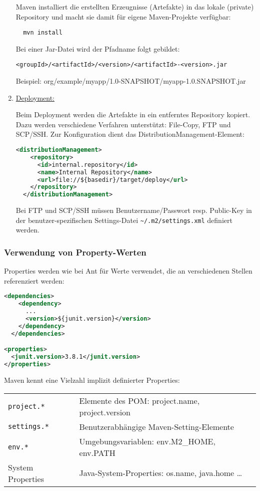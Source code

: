 \begin{enumerate}
Maven installiert die erstellten Erzeugnisse (Artefakte) in das lokale (private)
Repository und macht sie damit für eigene Maven-Projekte verfügbar:
\begin{lstlisting}
  mvn install
\end{lstlisting}
Bei einer Jar-Datei wird der Pfadname folgt gebildet:
\begin{verbatim}
<groupId>/<artifactId>/<version>/<artifactId>-<version>.jar
\end{verbatim}
Beispiel: org/example/myapp/1.0-SNAPSHOT/myapp-1.0.SNAPSHOT.jar
%
\newslide
\item \underline{Deployment:}

Beim Deployment werden die Artefakte in ein entferntes Repository
kopiert. Dazu werden verschiedene Verfahren unterstützt: File-Copy,
FTP und SCP/SSH.
Zur Konfiguration dient das DistributionManagement-Element:
\begin{lstlisting}[language=xml,
  morekeywords={distributionManagement,repository,id,name,url}]
  <distributionManagement>
    <repository>
      <id>internal.repository</id>
      <name>Internal Repository</name>
      <url>file://${basedir}/target/deploy</url>
    </repository>
  </distributionManagement>
\end{lstlisting}
Bei FTP und SCP/SSH müssen Benutzername/Passwort resp. Public-Key in
der benutzer-spezifischen Settings-Datei \verb+~/.m2/settings.xml+
definiert werden.
\end{enumerate}
\newslide
\subsubsection{Verwendung von Property-Werten}
Properties werden wie bei Ant für
Werte verwendet, die an verschiedenen Stellen referenziert werden:
\begin{lstlisting}[language=xml,
 morekeywords={dependencies,dependency,groupId,artifactId,
   version,scope,properties,junit}]
  <dependencies>
    <dependency>
      ...
      <version>${junit.version}</version>
    </dependency>
  </dependencies>

<properties>
  <junit.version>3.8.1</junit.version>
</properties>
\end{lstlisting}
\newslide
Maven kennt eine Vielzahl implizit definierter Properties:

\begin{tabularx}{\linewidth}{lX}
\verb+project.*+ & Elemente des POM: project.name, project.version\\
\verb+settings.*+ & Benutzerabhängige Maven-Setting-Elemente\\
\verb+env.*+ & Umgebungsvariablen: env.M2\_HOME, env.PATH \\
System Properties & Java-System-Properties: os.name, java.home \ldots\\
\end{tabularx}
\newslide
